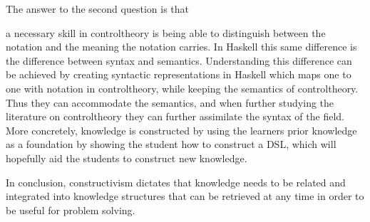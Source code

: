 \begin{newtext}
The answer to the second question is that %
\end{newtext}
a necessary skill in \gls{controltheory} is being able to distinguish between the notation and the meaning the notation carries. In Haskell this same difference is the difference between syntax and semantics. Understanding this difference can be achieved by creating syntactic representations in \gls{Haskell} which maps one to one with notation in \gls{controltheory}, while keeping the semantics of \gls{controltheory}. Thus they can accommodate the semantics, and when further studying the literature on \gls{controltheory} they can further assimilate the syntax of the field. More concretely, knowledge is constructed by using the learners prior knowledge as a foundation by showing the student how to construct a \gls{DSL}, which will hopefully aid the students to construct new knowledge.

In conclusion, constructivism dictates that knowledge needs to be related and integrated into knowledge structures that can be retrieved at any time in order to be useful for problem solving. 

%
%
%






